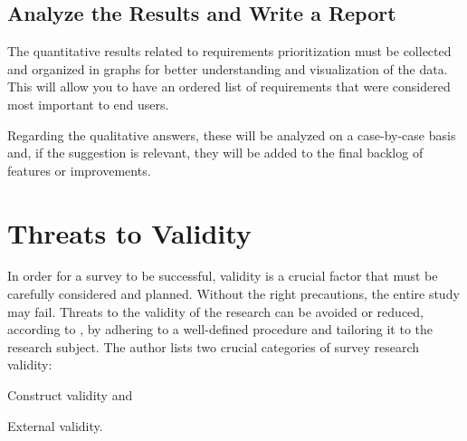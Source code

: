 \subsection{Analyze the Results and Write a Report}\label{sec:survey-analyse}

The quantitative results related to requirements prioritization must be collected and organized in graphs for better understanding and visualization of the data.
This will allow you to have an ordered list of requirements that were considered most important to end users.


Regarding the qualitative answers, these will be analyzed on a case-by-case basis and, if the suggestion is relevant, they will be added to the final backlog of features or improvements.
\section{Threats to Validity}\label{sec:survey-threats}

In order for a survey to be successful, validity is a crucial factor that must be carefully considered and planned. Without the right precautions, the entire study may fail. Threats to the validity of the research can be avoided or reduced, according to , by adhering to a well-defined procedure and tailoring it to the research subject. The author lists two crucial categories of survey research validity:
\begin{inparaenum}[(1)]
  \item Construct validity and
  \item External validity.
\end{inparaenum}

